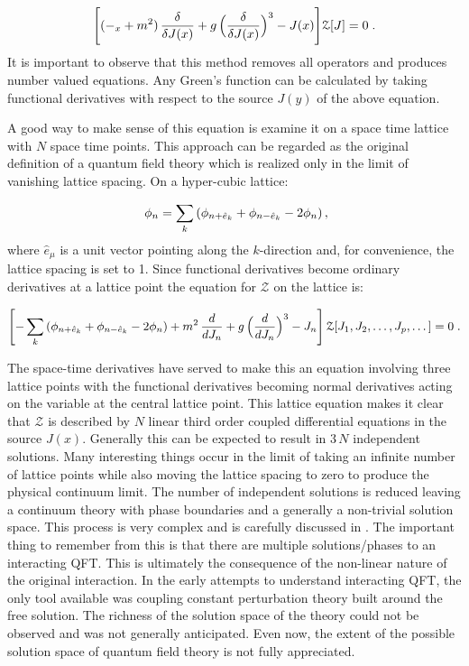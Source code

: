 \documentclass[12pt]{article}
\newcommand{\bo}{\raise+0.0mm\hbox{$\Box$}}
\begin{document}
\begin{equation*}
  \Biggl[(-\bo_x + m^2)\,\frac{\delta}{\delta J(x)}  +
    g\,\Bigl(\frac{\delta}{\delta J(x)}\Bigr)^3 - J(x)\Biggr] \mathcal{Z}[J] = 0 \; .
\end{equation*}
It is important to observe that this method removes all operators and produces
number valued equations. Any Green's function can
be calculated by taking functional derivatives with respect to the source
$J(y)$ of the above equation.

A good way to make sense of this equation is examine it on a space time
lattice with $N$ space time points. This approach can be regarded as the
original definition of a quantum field theory which is realized only in the
limit of vanishing lattice spacing.  On a hyper-cubic lattice:

\begin{equation}
  \bo\ {\phi}_n = \sum_k \left({\phi}_{n+\hat{e}_k} + {\phi}_{n-\hat{e}_k}-2{\phi}_{n}\right),
\end{equation}
%
where $\hat{e}_\mu$ is a unit vector pointing along the $k$-direction and, for
convenience, the lattice spacing is set to 1. Since functional
derivatives become ordinary derivatives at a lattice point the equation for $\mathcal{Z}$ on the
lattice is:

\begin{equation}
 \Biggl[- \sum_k \left({\phi}_{n+\hat{e}_k} +
   {\phi}_{n-\hat{e}_k}-2{\phi}_{n}\right) + m^2\, \frac{d}{dJ_{n}} + g\, \Bigl( \frac{d}{d J_{n}} \Bigr)^3 - J_{n} \Biggr]\,
    \mathcal{Z}[J_{1},J_{2},\dotsc,J_{p},\dotsc] = 0 \; .
\end{equation}

The space-time derivatives have served to make this an equation involving
three lattice points with the functional derivatives becoming normal
derivatives acting on the variable at the central lattice point. This lattice
equation makes it clear that $\mathcal{Z}$ is described by $N$ linear third order coupled
differential equations in the source $J(x)$. Generally this can be expected to
result in $3\, N$ independent solutions. Many interesting things occur in the limit
of taking an infinite number of lattice points while also moving the lattice
spacing to zero to produce the physical continuum limit. The number of
independent solutions is reduced leaving a continuum theory with phase
boundaries and a generally a non-trivial solution space. This process is very
complex and is carefully discussed in \cite{ggg;1996,ggzg;2007}. The important thing to
remember from this is that there are multiple solutions/phases to an
interacting QFT. This is ultimately the consequence of the non-linear nature of
the original interaction. In the early attempts to understand interacting QFT,
the only tool available was coupling constant perturbation theory built around
the free solution. The richness of the solution space of the theory could
not be observed and was not generally anticipated. Even now, the extent of
the possible solution space of quantum field theory is not fully appreciated.
\end{document}
